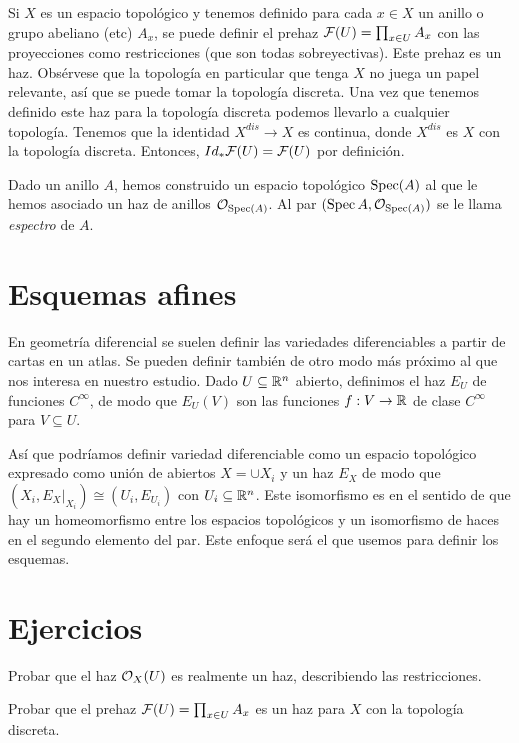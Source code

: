 \documentclass[GA.tex]{subfiles}
\begin{document}
\begin{nota}
Si $X$ es un espacio topológico y tenemos definido para cada $x\in X$ un anillo o grupo abeliano (etc) $A_x$, se puede definir el prehaz $\mathcal{F}(U)=\prod_{x\in U} A_x$ con las proyecciones como restricciones (que son todas sobreyectivas). Este prehaz es un haz. Obsérvese que la topología en particular que tenga $X$ no juega un papel relevante, así que se puede tomar la topología discreta. Una vez que tenemos definido este haz para la topología discreta podemos llevarlo a cualquier topología. Tenemos que la identidad $X^{dis}\to X$ es continua, donde $X^{dis}$ es $X$ con la topología discreta. Entonces, $Id_*\mathcal{F}(U)=\mathcal{F}(U)$ por definición. 
\end{nota}

Dado un anillo $A$, hemos construido un espacio topológico $\operatorname{Spec}(A)$ al que le hemos asociado un haz de anillos ${\mathcal O}_{\operatorname{Spec}(A)}$. Al par $(\operatorname{Spec}{A}, {\mathcal O}_{\operatorname{Spec}(A)})$ se le llama \emph{espectro} de $A$. 




\section{Esquemas afines}

En geometría diferencial se suelen definir las variedades diferenciables a partir de cartas en un atlas. Se pueden definir también de otro modo más próximo al que nos interesa en nuestro estudio. Dado $U\subseteq\mathbb{R}^n$ abierto, definimos el haz $E_U$ de funciones $C^{\infty}$, de modo que $E_U(V)$ son las funciones $f:V\to\mathbb{R}$ de clase $C^{\infty}$ para $V\subseteq U$.

 Así que podríamos definir variedad diferenciable como un espacio topológico expresado como unión de abiertos $X=\cup X_i$ y un haz $E_X$ de modo que $(X_i,E_X|_{X_i})\cong (U_i,E_{U_i})$ con $U_i\subseteq\mathbb{R}^n$. Este isomorfismo es en el sentido de que hay un homeomorfismo entre los espacios topológicos y un isomorfismo de haces en el segundo elemento del par. Este enfoque será el que usemos para definir los esquemas. 
\section{Ejercicios}
\begin{ejer}
Probar que el haz ${\mathcal O}_X(U)$ es realmente un haz, describiendo las restricciones. 
\end{ejer}
\begin{ejer}
Probar que el prehaz $\mathcal{F}(U)=\prod_{x\in U} A_x$ es un haz para $X$ con la topología discreta. 
\end{ejer}
\end{document}

